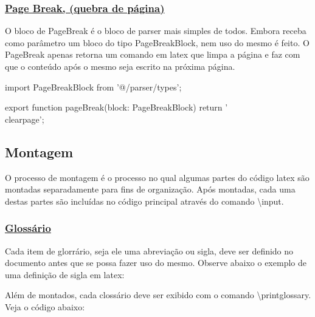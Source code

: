 \subsubsection{\underline{Page Break, (quebra de página)}}

O bloco de PageBreak é o bloco de parser mais simples de todos.
Embora receba como parâmetro um bloco do tipo PageBreakBlock,
nem uso do mesmo é feito.
O PageBreak apenas retorna um comando em
\acrshort{latex}
que limpa a página e faz com que o conteúdo após o mesmo
seja escrito na próxima página.

\begin{getPageBreak1}
import { PageBreakBlock } from '@/parser/types';

export function pageBreak(block: PageBreakBlock){
    return '\\clearpage';
}
\end{getPageBreak1}

\subsection{Montagem}

O processo de montagem é o processo no qual algumas partes do código
\acrshort{latex}
são montadas separadamente para fins de organização.
Após montadas, cada uma destas partes são incluídas no código principal
através do comando \textbackslash input.

\subsubsection{\underline{Glossário}}

Cada item de glorrário, seja ele uma abreviação ou sigla,
deve ser definido no documento antes que se possa fazer uso do mesmo.
Observe abaixo o exemplo de uma definição de sigla em
\acrshort{latex}:

\begin{Codea4f7062fa9ce44a0bed3adc544106faf}
\end{Codea4f7062fa9ce44a0bed3adc544106faf}

Além de montados, cada clossário deve ser exibido com o comando
\textbackslash printglossary. Veja o código abaixo:

\begin{Codeb9e35110de7d46819ae466a98a8d891d}
\printglossary[type=sigla,title=LISTA DE SIGLAS]
\clearpage

\printglossary[type=abreviacao,title=LISTA DE ABREVIATURAS]
\clearpage
\end{Codeb9e35110de7d46819ae466a98a8d891d}

